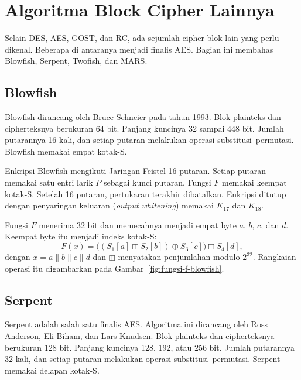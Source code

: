 \section{Algoritma Block Cipher Lainnya}
\label{sec:cipher-lainnya}


Selain DES, AES, GOST, dan RC, ada sejumlah cipher blok lain yang perlu dikenal.
Beberapa di antaranya menjadi finalis AES. Bagian ini membahas Blowfish, Serpent,
Twofish, dan MARS.

\subsection{Blowfish}

Blowfish dirancang oleh Bruce Schneier pada tahun 1993. Blok plainteks dan
cipherteksnya berukuran 64 bit. Panjang kuncinya 32 sampai 448 bit. Jumlah
putarannya 16 kali, dan setiap putaran melakukan operasi substitusi--permutasi.
Blowfish memakai empat kotak-S.

Enkripsi Blowfish mengikuti Jaringan Feistel 16 putaran. Setiap putaran memakai
satu entri larik $P$ sebagai kunci putaran. Fungsi $F$ memakai keempat kotak-S.
Setelah 16 putaran, pertukaran terakhir dibatalkan. Enkripsi ditutup dengan
penyaringan keluaran (\textit{output whitening}) memakai $K_{17}$ dan $K_{18}$.

Fungsi $F$ menerima 32 bit dan memecahnya menjadi empat byte $a$, $b$, $c$, dan
$d$. Keempat byte itu menjadi indeks kotak-S:
\begin{equation}
F(x) = \bigl( (S_1[a] \boxplus S_2[b]) \oplus S_3[c] \bigr) \boxplus S_4[d],
\label{eq:fungsi-f-blowfish}
\end{equation}
dengan $x = a \| b \| c \| d$ dan $\boxplus$ menyatakan penjumlahan modulo
$2^{32}$. Rangkaian operasi itu digambarkan pada
Gambar~\ref{fig:fungsi-f-blowfish}.



\subsection{Serpent}

Serpent adalah salah satu finalis AES. Algoritma ini dirancang oleh Ross
Anderson, Eli Biham, dan Lars Knudsen. Blok plainteks dan cipherteksnya berukuran
128 bit. Panjang kuncinya 128, 192, atau 256 bit. Jumlah putarannya 32 kali, dan
setiap putaran melakukan operasi substitusi--permutasi. Serpent memakai delapan
kotak-S.

